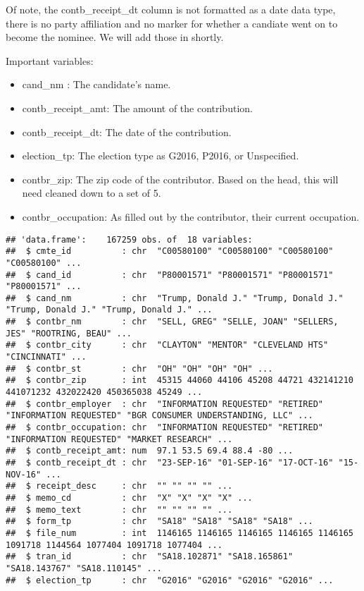 \documentclass[]{article}
\providecommand{\tightlist}{%
  \setlength{\itemsep}{0pt}\setlength{\parskip}{0pt}}
\begin{document}
Of note, the contb\_receipt\_dt column is not formatted as a date data
type, there is no party affiliation and no marker for whether a candiate
went on to become the nominee. We will add those in shortly.

Important variables:

\begin{itemize}
\tightlist
\item
  cand\_nm : The candidate's name.
\item
  contb\_receipt\_amt: The amount of the contribution.
\item
  contb\_receipt\_dt: The date of the contribution.
\item
  election\_tp: The election type as G2016, P2016, or Unspecified.
\item
  contbr\_zip: The zip code of the contributor. Based on the head, this
  will need cleaned down to a set of 5.
\item
  contbr\_occupation: As filled out by the contributor, their current
  occupation.
\end{itemize}

\begin{verbatim}
## 'data.frame':    167259 obs. of  18 variables:
##  $ cmte_id          : chr  "C00580100" "C00580100" "C00580100" "C00580100" ...
##  $ cand_id          : chr  "P80001571" "P80001571" "P80001571" "P80001571" ...
##  $ cand_nm          : chr  "Trump, Donald J." "Trump, Donald J." "Trump, Donald J." "Trump, Donald J." ...
##  $ contbr_nm        : chr  "SELL, GREG" "SELLE, JOAN" "SELLERS, JES" "ROOTRING, BEAU" ...
##  $ contbr_city      : chr  "CLAYTON" "MENTOR" "CLEVELAND HTS" "CINCINNATI" ...
##  $ contbr_st        : chr  "OH" "OH" "OH" "OH" ...
##  $ contbr_zip       : int  45315 44060 44106 45208 44721 432141210 441071232 432022420 450365038 45249 ...
##  $ contbr_employer  : chr  "INFORMATION REQUESTED" "RETIRED" "INFORMATION REQUESTED" "BGR CONSUMER UNDERSTANDING, LLC" ...
##  $ contbr_occupation: chr  "INFORMATION REQUESTED" "RETIRED" "INFORMATION REQUESTED" "MARKET RESEARCH" ...
##  $ contb_receipt_amt: num  97.1 53.5 69.4 88.4 -80 ...
##  $ contb_receipt_dt : chr  "23-SEP-16" "01-SEP-16" "17-OCT-16" "15-NOV-16" ...
##  $ receipt_desc     : chr  "" "" "" "" ...
##  $ memo_cd          : chr  "X" "X" "X" "X" ...
##  $ memo_text        : chr  "" "" "" "" ...
##  $ form_tp          : chr  "SA18" "SA18" "SA18" "SA18" ...
##  $ file_num         : int  1146165 1146165 1146165 1146165 1146165 1091718 1144564 1077404 1091718 1077404 ...
##  $ tran_id          : chr  "SA18.102871" "SA18.165861" "SA18.143767" "SA18.110145" ...
##  $ election_tp      : chr  "G2016" "G2016" "G2016" "G2016" ...
\end{verbatim}
\end{document}
